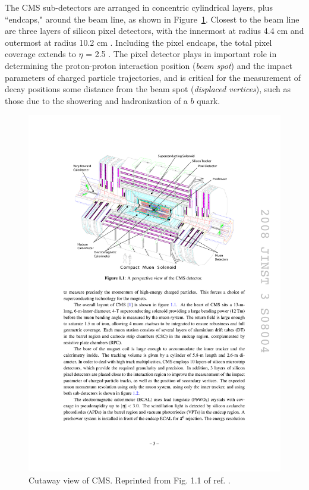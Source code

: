 \documentclass[dissertation.tex]{subfiles}
\begin{document}
The CMS sub-detectors are arranged in concentric cylindrical layers, plus ``endcaps," around the beam line, as shown in Figure~\ref{fig:CMS_cutaway}.  Closest to the beam line are three layers of silicon pixel detectors, with the innermost at radius 4.4 cm and outermost at radius 10.2 cm \cite{CMS_detector_paper}.  Including the pixel endcaps, the total pixel coverage extends to $\eta$ = 2.5 \cite{CMS_detector_paper}.  The pixel detector plays in important role in determining the proton-proton interaction position (\textit{beam spot}) and the impact parameters of charged particle trajectories, and is critical for the measurement of decay positions some distance from the beam spot (\textit{displaced vertices}), such as those due to the showering and hadronization of a $b$ quark.

\begin{figure}
	\centering
	\includegraphics[scale=1.0]{CMS_cutaway}
	\caption{Cutaway view of CMS.  Reprinted from Fig. 1.1 of ref. \cite{CMS_detector_paper}.}
	\label{fig:CMS_cutaway}
\end{figure}
\end{document}
